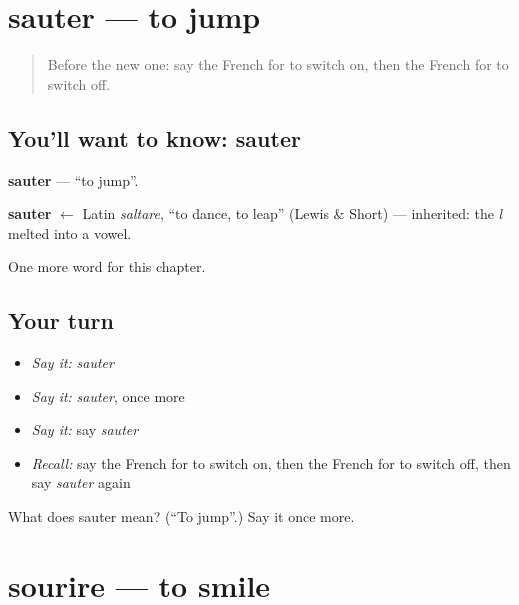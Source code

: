 \section[sauter]{sauter — to jump}

\label{lesson:FR-C143-sauter}



\begin{quote}
Before the new one: say the French for to switch on, then the French for to switch off.
\end{quote}

\subsection*{You'll want to know: sauter}
\textbf{sauter} — \textquotedblleft{}to jump\textquotedblright{}.

\begin{cousinweb}
\textbf{sauter} $\leftarrow$ Latin \emph{saltare}, \textquotedblleft{}to dance, to leap\textquotedblright{} (Lewis \& Short) — inherited: the \emph{l} melted into a vowel.
\end{cousinweb}

\begin{grammarlens}[title={What you've built}]
One more word for this chapter.
\end{grammarlens}

\subsection*{Your turn}
\begin{itemize}
\raggedright
  \item \emph{Say it:} \emph{sauter}
  \item \emph{Say it:} \emph{sauter}, once more
  \item \emph{Say it:} say \emph{sauter}
  \item \emph{Recall:} say the French for to switch on, then the French for to switch off, then say \emph{sauter} again
\end{itemize}

\begin{tcolorbox}[breakable,colback=teal!4,colframe=teal!35!black,title={Before you move on}]
What does sauter mean? (\textquotedblleft{}To jump\textquotedblright{}.) Say it once more.
\end{tcolorbox}
\section[sourire]{sourire — to smile}

